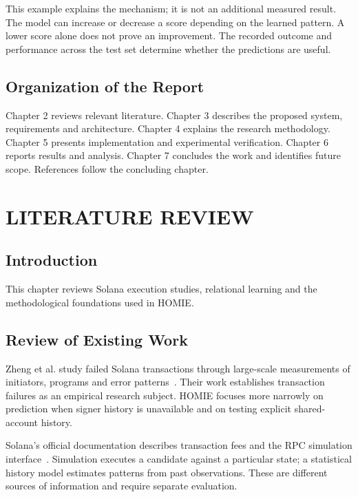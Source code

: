 \documentclass[12pt,a4paper,oneside]{report}
\begin{document}
This example explains the mechanism; it is not an additional measured result. The model can increase or decrease a score depending on the learned pattern. A lower score alone does not prove an improvement. The recorded outcome and performance across the test set determine whether the predictions are useful.

\section{Organization of the Report}
Chapter 2 reviews relevant literature. Chapter 3 describes the proposed system, requirements and architecture. Chapter 4 explains the research methodology. Chapter 5 presents implementation and experimental verification. Chapter 6 reports results and analysis. Chapter 7 concludes the work and identifies future scope. References follow the concluding chapter.

\chapter{LITERATURE REVIEW}
\section{Introduction}
This chapter reviews Solana execution studies, relational learning and the methodological foundations used in HOMIE.

\section{Review of Existing Work}
Zheng et al. study failed Solana transactions through large-scale measurements of initiators, programs and error patterns~\cite{zheng}. Their work establishes transaction failures as an empirical research subject. HOMIE focuses more narrowly on prediction when signer history is unavailable and on testing explicit shared-account history.

Solana's official documentation describes transaction fees and the RPC simulation interface~\cite{fees,simulation,send}. Simulation executes a candidate against a particular state; a statistical history model estimates patterns from past observations. These are different sources of information and require separate evaluation.
\end{document}
